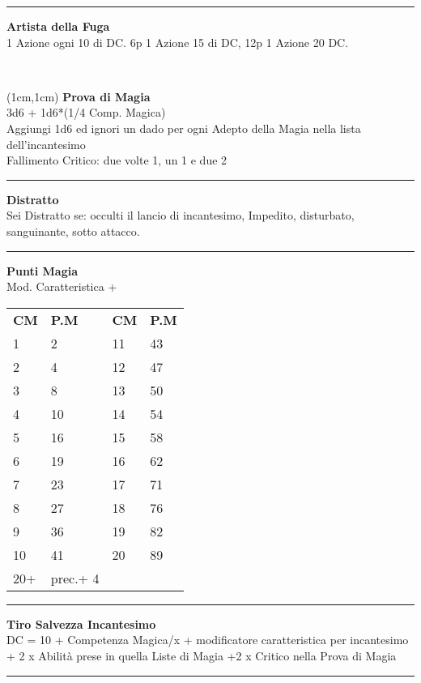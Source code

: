 \documentclass[a4paper,12 pt,openany]{book}
\newcommand{\riga}{\rule{\textwidth}{0.4pt}}
\begin{document}
\begin{textblock*}{7cm}
\riga

\textbf{Artista della Fuga}\\
1 Azione ogni 10 di DC. 6p 1 Azione 15 di DC, 12p 1 Azione 20 DC.

\end{textblock*}

~\newpage

\begin{textblock*}{5cm}(1cm,1cm) %
\textbf{Prova di Magia}\\
3d6 + 1d6*(1/4 Comp. Magica)\\
Aggiungi 1d6 ed ignori un dado per ogni Adepto della Magia nella lista dell'incantesimo\\
Fallimento Critico: due volte 1, un 1 e due 2\\


\riga

\textbf{Distratto}\\
Sei Distratto se: occulti il lancio di incantesimo, Impedito, disturbato, sanguinante, sotto attacco.\\

\riga

\textbf{Punti Magia}\\
Mod. Caratteristica + \\

\begin{tabular}{ll|ll}
\textbf{CM} & \textbf{P.M}&	\textbf{CM} & \textbf{P.M}\\
	1&	2 	&11&43\\
2&	4	&12&47\\
3&	8	&13&50\\
4&	10	&14&54\\
5&	16	&15&58\\
6&	19	&16&62\\
7&	23	&17&71\\
8&	27	&18&76\\
9&	36	&19&82\\
10&	41	&20&89\\
20+&prec.+ 4&&\\
\end{tabular}

\riga

\textbf{Tiro Salvezza Incantesimo}\\
DC = 10 + Competenza Magica/x + modificatore caratteristica per incantesimo + 2 x Abilità prese in quella Liste di Magia +2 x Critico nella Prova di Magia

\riga


\end{textblock*}
\end{document}
